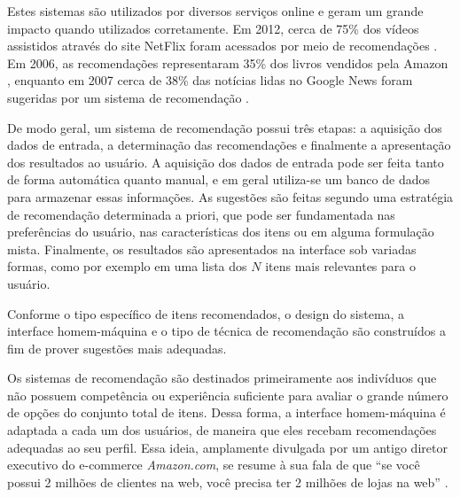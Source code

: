 Estes sistemas são utilizados por diversos serviços online e geram um grande impacto quando utilizados corretamente. Em 2012, cerca de 75\% dos vídeos assistidos através do site NetFlix foram acessados por meio de recomendações \cite{netflix75}. Em 2006, as recomendações representaram 35\% dos livros vendidos pela Amazon \cite{amazon35}, enquanto em 2007 cerca de 38\% das notícias lidas no Google News  foram sugeridas por um sistema de recomendação \cite{das2007google}.

De modo geral, um sistema de recomendação possui três etapas: a aquisição dos dados de entrada, a determinação das recomendações e finalmente a apresentação dos resultados ao usuário. A aquisição dos dados de entrada pode ser feita tanto de forma automática quanto manual, e em geral utiliza-se um banco de dados para armazenar essas informações. As sugestões são feitas segundo uma estratégia de recomendação determinada a priori, que pode ser fundamentada nas preferências do usuário, nas características dos itens ou em alguma formulação mista. Finalmente, os resultados são apresentados na interface sob variadas formas, como por exemplo em uma lista dos $N$ itens mais relevantes para o usuário.   

Conforme o tipo específico de itens recomendados, o design do sistema, a interface homem-máquina e o tipo de técnica de recomendação são construídos a fim de prover sugestões mais adequadas.

Os sistemas de recomendação são destinados primeiramente aos indivíduos que não possuem competência ou experiência suficiente para avaliar o grande número de opções do conjunto total de itens. Dessa forma, a interface homem-máquina é adaptada a cada um dos usuários, de maneira que eles recebam recomendações adequadas ao seu perfil. Essa ideia, amplamente divulgada por um antigo diretor executivo do e-commerce \textit{Amazon.com}, se resume à sua fala de que ``se você possui 2 milhões de clientes na web, você precisa ter 2 milhões de lojas na web'' \cite{schafer1999recommender}. 